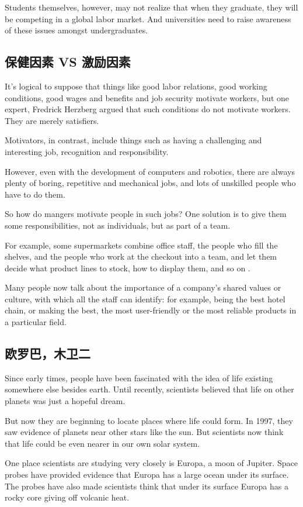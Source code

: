 Students themselves, however, may not realize that
when they graduate, they will be competing in a global
labor market. And universities need to raise awareness of
these issues amongst undergraduates.
\subsection{保健因素 VS 激励因素}
It's logical to suppose that things like good labor relations,
good working conditions, good wages and benefits and
job security motivate workers, but one expert, Fredrick
Herzberg argued that such conditions do not motivate
workers. They are merely satisfiers.

Motivators, in contrast, include things
such as having a challenging and interesting job, recognition
and responsibility.

However, even with the development of computers
and robotics, there are always plenty of boring, repetitive
and mechanical jobs, and lots of unskilled people who
have to do them.

So how do mangers motivate people in such jobs? One
solution is to give them some responsibilities, not as individuals,
but as part of a team.

For example, some supermarkets combine office
staff, the people who fill the shelves, and the people who
work at the checkout into a team, and let them decide
what product lines to stock, how to display them, and so
on .

Many people now talk about the importance of a company's
shared values or culture, with which all the staff
can identify: for example, being the best hotel chain, or
making the best, the most user-friendly or the most reliable
products in a particular field.
\subsection{欧罗巴，木卫二}
Since early times, people have been fascinated with the
idea of life existing somewhere else besides earth.
Until recently, scientists believed that life on other planets
was just a hopeful dream.

But now they are beginning to locate places where life
could form. In 1997, they saw evidence of planets near
other stars like the sun. But scientists now think that life
could be even nearer in our own solar system.

One place scientists are studying very closely is Europa,
a moon of Jupiter. Space probes have provided
evidence that Europa has a large ocean under its surface.
The probes have also made scientists think that under its
surface Europa has a rocky core giving off volcanic heat.

